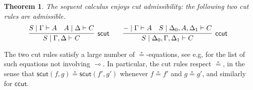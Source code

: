 \documentclass[copyright,creativecommons]{eptcs}
\newtheorem{theorem}{Theorem}[section]
\theoremstyle{definition}
\newcommand{\lolli}{\multimap}
\begin{document}
\begin{theorem}
The sequent calculus enjoys cut admissibility: the following two cut rules are admissible.
  \begin{displaymath}
    \infer[\mathsf{scut}]{S \mid \Gamma , \Delta \vdash C}{
      S \mid \Gamma \vdash A
      &
      A \mid \Delta \vdash C
    }
    \qquad
    \infer[\mathsf{ccut}]{S \mid \Delta_0 , \Gamma , \Delta_1 \vdash C}{
      {-} \mid \Gamma \vdash A
      &
      S \mid \Delta_0 , A , \Delta_1 \vdash C
    }
  \end{displaymath}
\end{theorem}
The two cut rules satisfy a large number of
$\circeq$-equations, see e.g, \cite[Figures 5 and 6]{uustalu:sequent:2021} for the
list of such equations not involving $\lolli$.
In particular, the cut rules respect $\circeq$, in the sense that $\mathsf{scut}(f,g) \circeq \mathsf{scut}(f',g')$ whenever $f \circeq f'$ and $g \circeq g'$, and similarly for $\mathsf{ccut}$.
\end{document}
